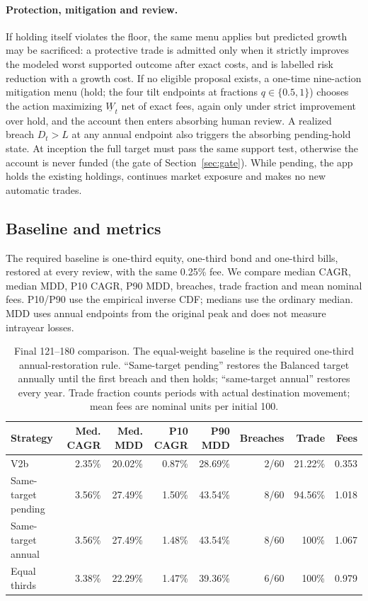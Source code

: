 \documentclass[11pt,a4paper]{article}
\begin{document}
\paragraph{Protection, mitigation and review.}
If holding itself violates the floor, the same menu applies but predicted growth
may be sacrificed: a protective trade is admitted only when it strictly improves
the modeled worst supported outcome after exact costs, and is labelled risk
reduction with a growth cost. If no eligible proposal exists, a one-time
nine-action mitigation menu (hold; the four tilt endpoints at fractions
$q\in\{0.5,1\}$) chooses the action maximizing $\underline W_t$ net of exact
fees, again only under strict improvement over hold, and the account then enters
absorbing human review. A realized breach $D_t>L$ at any annual endpoint also
triggers the absorbing pending-hold state. At inception the full target must
pass the same support test, otherwise the account is never funded (the gate of
Section~\ref{sec:gate}). While pending, the app holds the existing holdings,
continues market exposure and makes no new automatic trades.

\subsection{Baseline and metrics}
The required baseline is one-third equity, one-third bond and one-third bills,
restored at every review, with the same 0.25\% fee. We compare median CAGR,
median MDD, P10 CAGR, P90 MDD, breaches, trade fraction and mean nominal fees.
P10/P90 use the empirical inverse CDF; medians use the ordinary median. MDD uses
annual endpoints from the original peak and does not measure intrayear losses.

\begin{table}[H]
\centering
\caption{Final 121--180 comparison. The equal-weight baseline is the required
one-third annual-restoration rule. ``Same-target pending'' restores the Balanced
target annually until the first breach and then holds; ``same-target annual''
restores every year. Trade fraction counts periods with actual destination
movement; mean fees are nominal units per initial 100.}
\label{tab:q2}
\begin{tabular}{@{}lrrrrrrr@{}}
\toprule
Strategy & Med. CAGR & Med. MDD & P10 CAGR & P90 MDD & Breaches & Trade & Fees \\
\midrule
V2b & 2.35\% & 20.02\% & 0.87\% & 28.69\% & 2/60 & 21.22\% & 0.353 \\
Same-target pending & 3.56\% & 27.49\% & 1.50\% & 43.54\% & 8/60 & 94.56\% & 1.018 \\
Same-target annual & 3.56\% & 27.49\% & 1.48\% & 43.54\% & 8/60 & 100\% & 1.067 \\
Equal thirds & 3.38\% & 22.29\% & 1.47\% & 39.36\% & 6/60 & 100\% & 0.979 \\
\bottomrule
\end{tabular}
\end{table}
\end{document}

